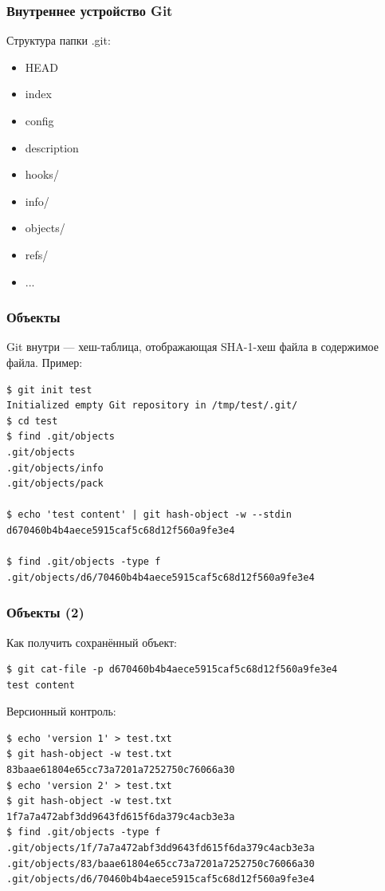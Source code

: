 \documentclass[xetex,mathserif,serif]{beamer}
\begin{document}
	\begin{frame}
		\frametitle{Внутреннее устройство Git}
		Структура папки .git:
		\begin{itemize}
			\item HEAD
			\item index
			\item config
			\item description
			\item hooks/
			\item info/
			\item objects/
			\item refs/
			\item ...
		\end{itemize}
	\end{frame}

	\begin{frame}[fragile]
		\frametitle{Объекты}
		Git внутри --- хеш-таблица, отображающая SHA-1-хеш файла в содержимое файла. Пример:
		\begin{verbatim}
$ git init test
Initialized empty Git repository in /tmp/test/.git/
$ cd test
$ find .git/objects
.git/objects
.git/objects/info
.git/objects/pack

$ echo 'test content' | git hash-object -w --stdin
d670460b4b4aece5915caf5c68d12f560a9fe3e4

$ find .git/objects -type f
.git/objects/d6/70460b4b4aece5915caf5c68d12f560a9fe3e4
		\end{verbatim}
	\end{frame}

	\begin{frame}[fragile]
		\frametitle{Объекты (2)}
		Как получить сохранённый объект:
		\begin{verbatim}
$ git cat-file -p d670460b4b4aece5915caf5c68d12f560a9fe3e4
test content
		\end{verbatim}

		Версионный контроль:
		\begin{verbatim}
$ echo 'version 1' > test.txt
$ git hash-object -w test.txt
83baae61804e65cc73a7201a7252750c76066a30
$ echo 'version 2' > test.txt
$ git hash-object -w test.txt
1f7a7a472abf3dd9643fd615f6da379c4acb3e3a
$ find .git/objects -type f
.git/objects/1f/7a7a472abf3dd9643fd615f6da379c4acb3e3a
.git/objects/83/baae61804e65cc73a7201a7252750c76066a30
.git/objects/d6/70460b4b4aece5915caf5c68d12f560a9fe3e4
		\end{verbatim}
	\end{frame}
\end{document}
